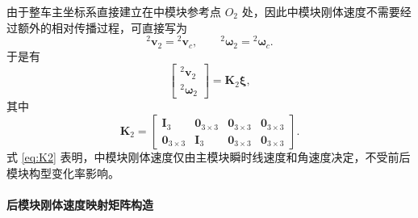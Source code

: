 由于整车主坐标系直接建立在中模块参考点 $O_2$ 处，因此中模块刚体速度不需要经过额外的相对传播过程，可直接写为
\begin{equation}
{}^{2}\mathbf v_2={}^2\mathbf v_c,
\qquad
{}^{2}\boldsymbol\omega_2={}^2\boldsymbol\omega_c.
\label{eq:middle_body_velocity_direct}
\end{equation}
于是有
\begin{equation}
\begin{bmatrix}
{}^{2}\mathbf v_2\\
{}^{2}\boldsymbol\omega_2
\end{bmatrix}
=
\mathbf K_2\boldsymbol\xi,
\label{eq:K2_mapping}
\end{equation}
其中
\begin{equation}
\mathbf K_2=
\begin{bmatrix}
\mathbf I_3 & \mathbf 0_{3\times 3} & \mathbf 0_{3\times 3} & \mathbf 0_{3\times 3}\\
\mathbf 0_{3\times 3} & \mathbf I_3 & \mathbf 0_{3\times 3} & \mathbf 0_{3\times 3}
\end{bmatrix}.
\label{eq:K2}
\end{equation}
式 \eqref{eq:K2} 表明，中模块刚体速度仅由主模块瞬时线速度和角速度决定，不受前后模块构型变化率影响。

\paragraph{后模块刚体速度映射矩阵构造}

